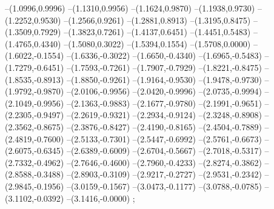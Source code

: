 {--(1.0996,0.9996)
--(1.1310,0.9956)
--(1.1624,0.9870)
--(1.1938,0.9730)
--(1.2252,0.9530)
--(1.2566,0.9261)
--(1.2881,0.8913)
--(1.3195,0.8475)
--(1.3509,0.7929)
--(1.3823,0.7261)
--(1.4137,0.6451)
--(1.4451,0.5483)
--(1.4765,0.4340)
--(1.5080,0.3022)
--(1.5394,0.1554)
--(1.5708,0.0000)
--(1.6022,-0.1554)
--(1.6336,-0.3022)
--(1.6650,-0.4340)
--(1.6965,-0.5483)
--(1.7279,-0.6451)
--(1.7593,-0.7261)
--(1.7907,-0.7929)
--(1.8221,-0.8475)
--(1.8535,-0.8913)
--(1.8850,-0.9261)
--(1.9164,-0.9530)
--(1.9478,-0.9730)
--(1.9792,-0.9870)
--(2.0106,-0.9956)
--(2.0420,-0.9996)
--(2.0735,-0.9994)
--(2.1049,-0.9956)
--(2.1363,-0.9883)
--(2.1677,-0.9780)
--(2.1991,-0.9651)
--(2.2305,-0.9497)
--(2.2619,-0.9321)
--(2.2934,-0.9124)
--(2.3248,-0.8908)
--(2.3562,-0.8675)
--(2.3876,-0.8427)
--(2.4190,-0.8165)
--(2.4504,-0.7889)
--(2.4819,-0.7600)
--(2.5133,-0.7301)
--(2.5447,-0.6992)
--(2.5761,-0.6673)
--(2.6075,-0.6345)
--(2.6389,-0.6009)
--(2.6704,-0.5667)
--(2.7018,-0.5317)
--(2.7332,-0.4962)
--(2.7646,-0.4600)
--(2.7960,-0.4233)
--(2.8274,-0.3862)
--(2.8588,-0.3488)
--(2.8903,-0.3109)
--(2.9217,-0.2727)
--(2.9531,-0.2342)
--(2.9845,-0.1956)
--(3.0159,-0.1567)
--(3.0473,-0.1177)
--(3.0788,-0.0785)
--(3.1102,-0.0392)
--(3.1416,-0.0000)
;}
